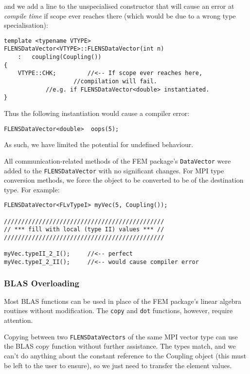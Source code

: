 and we add a line to the unspecialised constructor that will cause an error at \emph{compile time} if scope ever reaches there (which would be due to a wrong type specialisation):
\begin{lstlisting}
template <typename VTYPE>
FLENSDataVector<VTYPE>::FLENSDataVector(int n)
	:	coupling(Coupling())
{
	VTYPE::CHK;			//<-- If scope ever reaches here,
					//compilation will fail.
			//e.g. if FLENSDataVector<double> instantiated.
}
\end{lstlisting} 

Thus the following instantiation would cause a compiler error:
\begin{lstlisting}
FLENSDataVector<double>  oops(5);
\end{lstlisting}

As such, we have limited the potential for undefined behaviour. 

All communication-related methods of the FEM package's \texttt{DataVector} were added to the \texttt{FLENSDataVector} with no significant changes. For MPI type conversion methods, we force the object to be converted to be of the destination type. For example:
\begin{lstlisting}
FLENSDataVector<FLvTypeI> myVec(5, Coupling());

//////////////////////////////////////////////
// *** fill with local (type II) values *** //
//////////////////////////////////////////////

myVec.typeII_2_I();		//<-- perfect
myVec.typeI_2_II();		//<-- would cause compiler error
\end{lstlisting}

\subsubsection{BLAS Overloading}

Most BLAS functions can be used in place of the FEM package's linear algebra routines without modification. The \texttt{copy} and \texttt{dot} functions, however, require attention.

Copying between two \texttt{FLENSDataVectors} of the same MPI vector type can use the BLAS copy function without further assistance. The types match, and we can't do anything about the constant reference to the Coupling object (this must be left to the user to ensure), so we just need to transfer the element values. 

